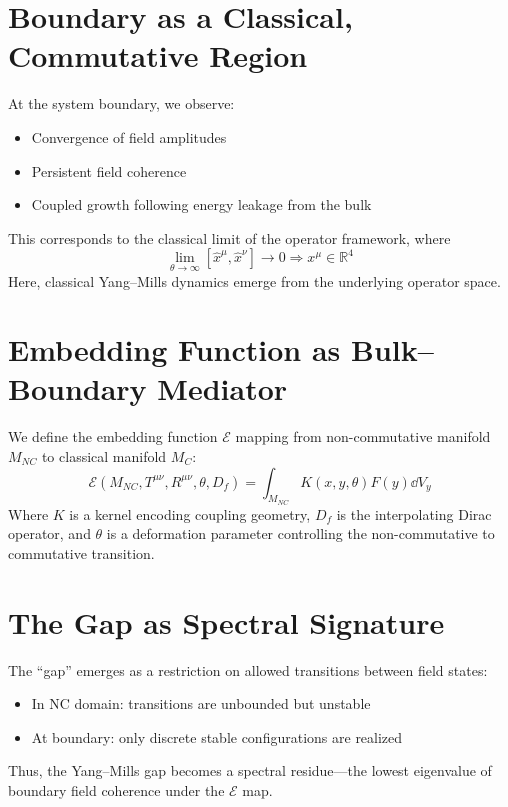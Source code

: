 \documentclass[11pt]{article}
\begin{document}
\section{Boundary as a Classical, Commutative Region}
At the system boundary, we observe:
\begin{itemize}
    \item Convergence of field amplitudes
    \item Persistent field coherence
    \item Coupled growth following energy leakage from the bulk
\end{itemize}
This corresponds to the classical limit of the operator framework, where
\begin{equation}
\lim_{\theta \to \infty} [\hat{x}^\mu, \hat{x}^\nu] \to 0 \Rightarrow x^\mu \in \mathbb{R}^4
\end{equation}
Here, classical Yang--Mills dynamics emerge from the underlying operator space.

\section{Embedding Function as Bulk--Boundary Mediator}
We define the embedding function \( \mathcal{E} \) mapping from non-commutative manifold \( M_{NC} \) to classical manifold \( M_C \):
\begin{equation}
\mathcal{E}(M_{NC}, T^{\mu\nu}, R^{\mu\nu}, \theta, D_f) = \int_{M_{NC}} K(x,y,\theta) F(y) \dd{V}_y
\end{equation}
Where \( K \) is a kernel encoding coupling geometry, \( D_f \) is the interpolating Dirac operator, and \( \theta \) is a deformation parameter controlling the non-commutative to commutative transition.

\section{The Gap as Spectral Signature}
The ``gap'' emerges as a restriction on allowed transitions between field states:
\begin{itemize}
    \item In NC domain: transitions are unbounded but unstable
    \item At boundary: only discrete stable configurations are realized
\end{itemize}
Thus, the Yang--Mills gap becomes a spectral residue---the lowest eigenvalue of boundary field coherence under the \( \mathcal{E} \) map.
\end{document}
